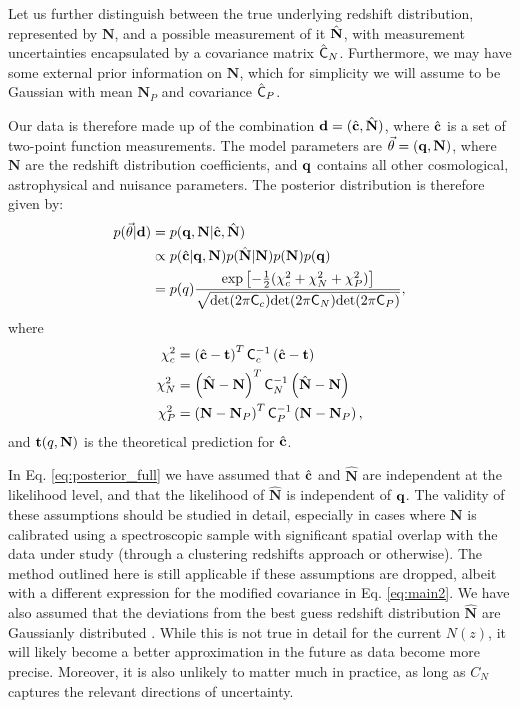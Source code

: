 \documentclass[a4paper,11pt]{article}
\newcommand{\vN}{\mathbf{N}}
\begin{document}
      Let us further distinguish between the true underlying redshift distribution, represented by $\vN$, and a possible measurement of it $\hat{\bf N}$, with measurement uncertainties encapsulated by a covariance matrix $\hat{\sf C}_N$. Furthermore, we may have some external prior information on $\vN$, which for simplicity we will assume to be Gaussian with mean $\vN_P$ and covariance $\hat{\sf C}_P$.
      
      Our data is therefore made up of the combination ${\bf d}=(\hat{\bf c},\hat{\bf N})$, where $\hat{\bf c}$ is a set of two-point function measurements. The model parameters are $\vec{\theta}=({\bf q},\vN)$, where $\vN$ are the redshift distribution coefficients, and ${\bf q}$ contains all other cosmological, astrophysical and nuisance parameters. The posterior distribution is therefore given by:
      \begin{align}
        p(\vec{\theta}|{\bf d})
        &=p({\bf q},\vN|\hat{\bf c},\hat{\bf N})\\\label{eq:posterior_full}
        &\propto p(\hat{\bf c}|{\bf q},\vN)p(\hat{\bf N}|\vN)p(\vN)p({\bf q})\\
        &=p(q)\frac{\exp\left[-\frac{1}{2}(\chi^2_c+\chi^2_N+\chi^2_P)\right]}{\sqrt{{\rm det}(2\pi{\sf C}_c){\rm det}(2\pi{\sf C}_N){\rm det}(2\pi{\sf C}_P)}},
      \end{align}
      where
      \begin{align}
        \chi^2_c&=\left(\hat{\bf c}-{\bf t}\right)^T{\sf C}_c^{-1}\left(\hat{\bf c}-{\bf t}\right)\\
        \chi^2_N&=\left(\hat{\bf N}-\vN\right)^T{\sf C}_N^{-1}\left(\hat{\bf N}-\vN\right)\\
        \chi^2_P&=\left(\vN-\vN_P\right)^T{\sf C}_P^{-1}\left(\vN-\vN_P\right),
      \end{align}
      and ${\bf t}(q,\vN)$ is the theoretical prediction for $\hat{\bf c}$.
      
      In Eq. \ref{eq:posterior_full} we have assumed that $\hat{\bf c}$ and $\hat{\vN}$ are independent at the likelihood level, and that the likelihood of $\hat{\vN}$ is independent of ${\bf q}$. The validity of these assumptions should be studied in detail, especially in cases where $\vN$ is calibrated using a spectroscopic sample with significant spatial overlap with the data under study (through a clustering redshifts approach \cite{2008ApJ...684...88N} or otherwise). The method outlined here is still applicable if these assumptions are dropped, albeit with a different expression for the modified covariance in Eq. \ref{eq:main2}. We have also assumed that the deviations from the best guess redshift distribution $\hat{\vN}$ are Gaussianly distributed \cite{2004.09542}. While this is not true in detail for the current $N(z)$, it will likely become a better approximation in the future as data become more precise. Moreover, it is also unlikely to  matter much in practice, as long as $C_N$ captures the relevant directions of uncertainty. 
\end{document}
